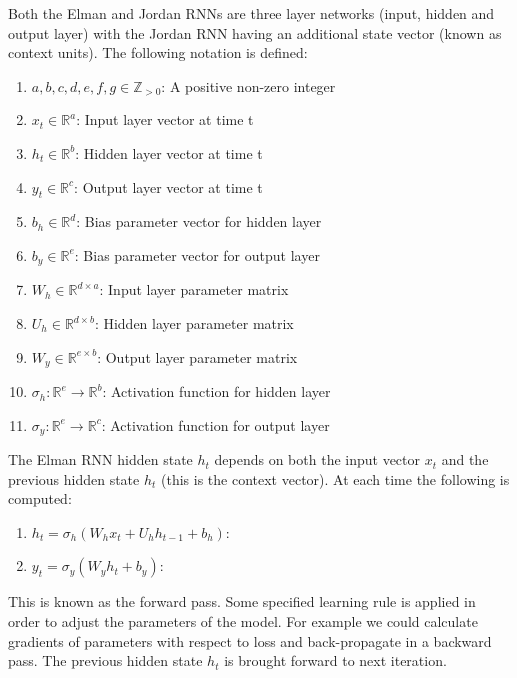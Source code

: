 \documentclass[conference]{IEEEtran}
\begin{document}
Both the Elman and Jordan RNNs are three layer networks (input, hidden and output layer) with the Jordan RNN having an additional state vector (known as context units). The following notation is defined:

\begin{enumerate}
	\item $a,b,c,d,e,f,g \in \mathbb{Z}_{>0}$: A positive non-zero integer
	
	\item $x_t \in \mathbb{R}^a$: Input layer vector at time t
	\item $h_t \in \mathbb{R}^b$: Hidden layer vector at time t
	\item $y_t \in \mathbb{R}^c$: Output layer vector at time t
	
	\item $b_h \in \mathbb{R}^{d}$: Bias parameter vector for hidden layer
	\item $b_y \in \mathbb{R}^{e}$: Bias parameter vector for output layer
	
	\item $W_h \in \mathbb{R}^{d \times a}$: Input layer parameter matrix
	\item $U_h \in \mathbb{R}^{d \times b}$: Hidden layer parameter matrix
	
	\item $W_y \in \mathbb{R}^{e \times b}$: Output layer parameter matrix
	
	
	\item $\sigma_h: \mathbb{R}^e \to \mathbb{R}^b $: Activation function for hidden layer
	\item $\sigma_y: \mathbb{R}^e \to \mathbb{R}^c $: Activation function for output layer
\end{enumerate}



The Elman RNN hidden state $h_t$ depends on both the input vector $x_t$ and the previous hidden state $h_t$ (this is the context vector). At each time the following is computed:

\begin{enumerate}
	\item $h_t = \sigma_h(W_h x_t + U_h h_{t-1} + b_h)$: 
	\item $y_t = \sigma_y(W_y h_t + b_y)$: 
\end{enumerate}

This is known as the forward pass. Some specified learning rule is applied in order to adjust the parameters of the model. For example we could calculate gradients of parameters with respect to loss and back-propagate in a backward pass. The previous hidden state $h_t$ is brought forward to next iteration.
\end{document}
